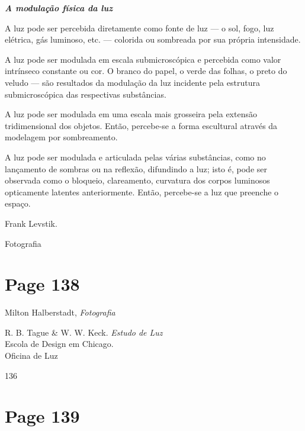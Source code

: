 \documentclass[a4paper]{article}
\begin{document}
\par\bigskip
\par\bigskip

\centering\textit{\textbf{A modulação física da luz}}
\par\bigskip

\noindent A luz pode ser percebida diretamente como fonte de luz --- o sol, fogo, luz elétrica, gás luminoso, etc. --- colorida ou sombreada por sua própria intensidade.

\par\bigskip

\noindent A luz pode ser modulada em escala submicroscópica e percebida como valor intrínseco constante ou cor. O branco do papel, o verde das folhas, o preto do veludo --- são resultados da modulação da luz incidente pela estrutura submicroscópica das respectivas substâncias.

\par\bigskip

\noindent A luz pode ser modulada em uma escala mais grosseira pela extensão tridimensional dos objetos. Então, percebe-se a forma escultural através da modelagem por sombreamento.

\par\bigskip

\noindent A luz pode ser modulada e articulada pelas várias substâncias, como no lançamento de sombras ou na reflexão, difundindo a luz; isto é, pode ser observada como o bloqueio, clareamento, curvatura dos corpos luminosos opticamente latentes anteriormente. Então, percebe-se a luz que preenche o espaço.

\vfill

Frank Levstik.

Fotografia

\newpage
\section*{Page 138}

\raggedright
Milton Halberstadt, \textit{Fotografia}

R. B. Tague \& W. W. Keck. \textit{Estudo de Luz}\\
Escola de Design em Chicago.\\
Oficina de Luz

136

\newpage
\section*{Page 139}
\end{document}
